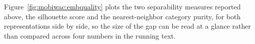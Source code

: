 \providecommand{\sd}[1]{\,{\scriptsize$\pm$#1}}


Figure~\ref{fig:mobiwac:embquality} plots the two separability measures reported above, the
silhouette score and the nearest-neighbor category purity, for both representations side by
side, so the size of the gap can be read at a glance rather than compared across four numbers
in the running text.

